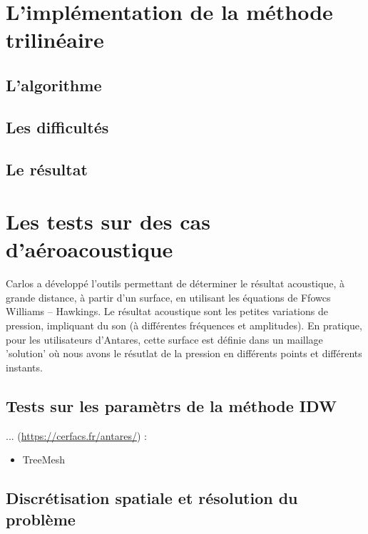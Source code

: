 \section{L'implémentation de la méthode trilinéaire}
\subsection{L'algorithme}
\subsection{Les difficultés}
\subsection{Le résultat}



\section{Les tests sur des cas d'aéroacoustique}
Carlos a développé l'outils permettant de déterminer le résultat acoustique, à grande distance, à partir d'un surface, en utilisant les équations de Ffowcs Williams – Hawkings. Le résultat acoustique sont les petites variations de pression, impliquant du son (à différentes fréquences et amplitudes). En pratique, pour les utilisateurs d'Antares, cette surface est définie dans un maillage 'solution' où nous avons le résutlat de la pression en différents points et différents instants.
\subsection{Tests sur les paramètrs de la méthode IDW}




... (\url{https://cerfacs.fr/antares/}) : 


\begin{itemize}
    \item TreeMesh 
\end{itemize}


\subsection{Discrétisation spatiale et résolution du problème}